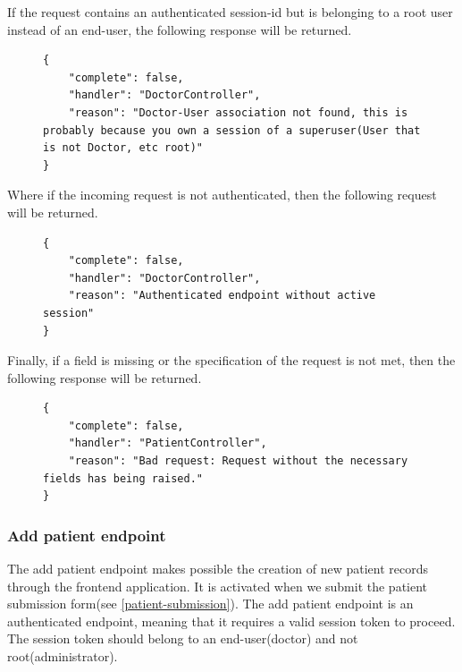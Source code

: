 					If the request contains an authenticated session-id but is belonging to a root user instead of an end-user, 
					the following response will be returned.
					\begin{figure}[H]
						\iftrue
						\begin{lstlisting}[]
{
	"complete": false,
	"handler": "DoctorController",
	"reason": "Doctor-User association not found, this is probably because you own a session of a superuser(User that is not Doctor, etc root)"
}
						\end{lstlisting}
					\end{figure}
					Where if the incoming request is not authenticated, then the following request will be returned.
					\begin{figure}[H]
						\iftrue
						\begin{lstlisting}[]
{
	"complete": false,
	"handler": "DoctorController",
	"reason": "Authenticated endpoint without active session"
}
						\end{lstlisting}
					\end{figure}
					Finally, if a field is missing or the specification of the request is not met, then the following response will be returned.
					\begin{figure}[H]
						\iftrue
						\begin{lstlisting}[]
{
	"complete": false,
	"handler": "PatientController",
	"reason": "Bad request: Request without the necessary fields has being raised."
}					
						\end{lstlisting}
					\end{figure}
				\subsubsection{Add patient endpoint}
				
					The add patient endpoint makes possible the creation of new patient records through the frontend application. 
					It is activated when we submit the patient submission form(see \ref{patient-submission}). The add patient endpoint 
					is an authenticated endpoint, meaning that it requires a valid session token to proceed. The session token should 
					belong to an end-user(doctor) and not root(administrator).

